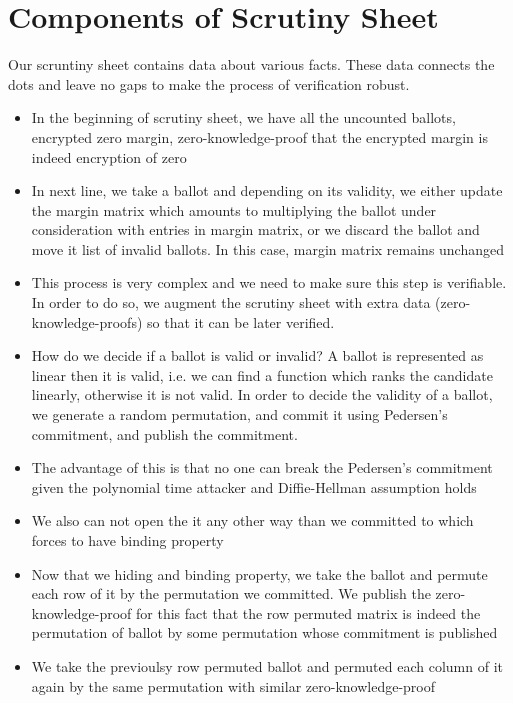 \section{Components of Scrutiny Sheet}
Our scruntiny sheet contains data about various facts. These data connects the dots and 
leave no gaps to make the process of verification robust. 
\begin{itemize}
\item In the beginning of scrutiny sheet, we have all the uncounted ballots, encrypted 
zero margin, zero-knowledge-proof that the encrypted margin is indeed encryption of 
zero
\item In next line, we take a ballot and depending on its validity, we either update 
the margin matrix which amounts to multiplying the ballot under consideration with 
entries in margin matrix, or we discard the ballot and move it list of invalid ballots. 
In this case, margin matrix remains unchanged
\item This process is very complex and we need to make sure this step 
is verifiable. In order to do so, we augment the scrutiny sheet with extra data 
(zero-knowledge-proofs) so that it can be later verified.  
\item How do we decide if a ballot is valid or invalid? A ballot is represented as 
linear then it is valid, i.e. we can find a function which ranks the candidate 
linearly, otherwise it is not valid.  In order to decide the validity of a ballot, 
we generate a random permutation, and commit it using Pedersen's commitment, 
and publish the commitment. 
\item The advantage of this is that no one can break the Pedersen's commitment 
given the polynomial time attacker and Diffie-Hellman assumption holds 

\item We also can not open the it any other way than we committed to which forces 
to have binding property

\item Now that we hiding and binding property, we take the ballot and permute 
each row of it by the permutation we committed. We publish the zero-knowledge-proof
for this fact that the row permuted matrix is indeed the permutation of ballot by 
some permutation whose commitment is published

\item We take the previoulsy row permuted ballot and permuted each column of 
it again by the same permutation with similar zero-knowledge-proof 


\end{itemize}
